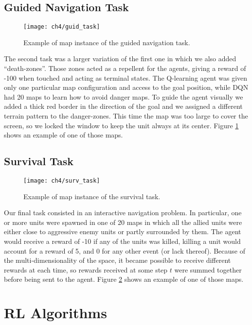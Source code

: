 \subsection{Guided Navigation Task}

\begin{figure}[h]
    \centering
    \texttt{[image: ch4/guid\_task]}
    \caption{Example of map instance of the guided navigation task.}
    \label{fig:guid_task}
\end{figure}

The second task was a larger variation of the first one in which we also added
``death-zones''. Those zones acted as a repellent for the agents, giving a
reward of -100 when touched and acting as terminal states. The Q-learning agent
was given only one particular map configuration and access to the goal position,
while DQN had 20 maps to learn how to avoid danger maps. To guide the agent
visually we added a thick red border in the direction of the goal and we
assigned a different terrain pattern to the danger-zones. This time the map was
too large to cover the screen, so we locked the window to keep the unit always
at its center. Figure \ref{fig:guid_task} shows an example of one of those maps.

\subsection{Survival Task}

\begin{figure}[h]
    \centering
    \texttt{[image: ch4/surv\_task]}
    \caption{Example of map instance of the survival task.}
    \label{fig:surv_task}
\end{figure}

Our final task consisted in an interactive navigation problem. In particular,
one or more units were spawned in one of 20 maps in which all the allied units
were either close to aggressive enemy units or partly surrounded by them.
The agent would receive a reward of -10 if any of the units was killed, killing
a unit would account for a reward of 5, and 0 for any other event (or lack
thereof). Because of the multi-dimensionality of the space, it became possible
to receive different rewards at each time, so rewards received at some step $t$
were summed together before being sent to the agent. Figure \ref{fig:surv_task}
shows an example of one of those maps.


\section{RL Algorithms}

